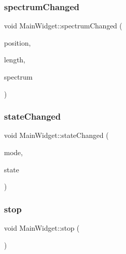 \hypertarget{class_main_widget_a48e11cd2d77cfd5cd495884d7d02bc56}{}\label{class_main_widget_a48e11cd2d77cfd5cd495884d7d02bc56} 
\subsubsection{\texorpdfstring{spectrum\+Changed}{spectrumChanged}}
{\footnotesize\ttfamily void Main\+Widget\+::spectrum\+Changed (\begin{DoxyParamCaption}\item[{qint64}]{position,  }\item[{qint64}]{length,  }\item[{const \hyperlink{class_frequency_spectrum}{Frequency\+Spectrum} \&}]{spectrum }\end{DoxyParamCaption})\hspace{0.3cm}{\ttfamily [slot]}}

\hypertarget{class_main_widget_a8d981512811804749379b2d239e38e55}{}\label{class_main_widget_a8d981512811804749379b2d239e38e55} 
\subsubsection{\texorpdfstring{state\+Changed}{stateChanged}}
{\footnotesize\ttfamily void Main\+Widget\+::state\+Changed (\begin{DoxyParamCaption}\item[{Q\+Audio\+::\+Mode}]{mode,  }\item[{Q\+Audio\+::\+State}]{state }\end{DoxyParamCaption})\hspace{0.3cm}{\ttfamily [slot]}}

\hypertarget{class_main_widget_acc7c201bd760f3e416703569165b94ea}{}\label{class_main_widget_acc7c201bd760f3e416703569165b94ea} 
\subsubsection{\texorpdfstring{stop}{stop}}
{\footnotesize\ttfamily void Main\+Widget\+::stop (\begin{DoxyParamCaption}{ }\end{DoxyParamCaption})\hspace{0.3cm}{\ttfamily [slot]}}

